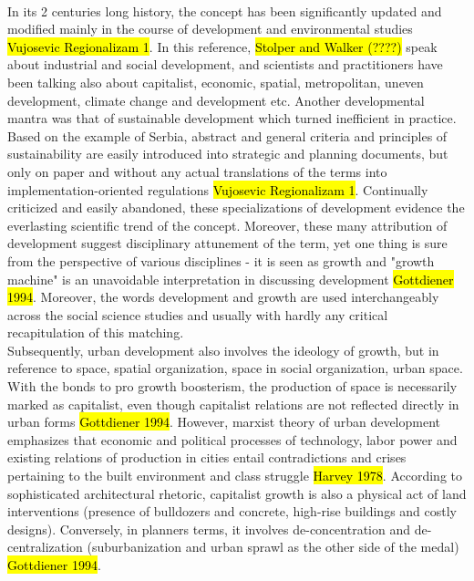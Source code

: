 \documentclass[11pt]{report}
\begin{document}
\\
In its 2 centuries long history, the concept has been significantly updated and modified mainly in the course of development and environmental studies \hl{Vujosevic Regionalizam 1}. In this reference, \hl{Stolper and Walker (????)} speak about industrial and social development, and scientists and practitioners have been talking also about capitalist, economic, spatial, metropolitan, uneven development, climate change and development etc.
Another developmental mantra was that of sustainable development which turned inefficient in practice\footnotemark. Based on the example of Serbia, abstract and general criteria and principles of sustainability are easily introduced into strategic and planning documents, but only on paper and without any actual translations of the terms into implementation-oriented regulations \hl{Vujosevic Regionalizam 1}.
Continually criticized and easily abandoned, these specializations of development evidence the everlasting scientific trend of the concept.
Moreover, these many attribution of development suggest disciplinary attunement of the term, yet one thing is sure from the perspective of various disciplines - it is seen as growth and "growth machine" is an unavoidable interpretation in discussing development \hl{Gottdiener 1994}.
Moreover, the words development and growth are used interchangeably across the social science studies and usually with hardly any critical recapitulation of this matching. 
\\
Subsequently, urban development also involves the ideology of growth, but in reference to space, spatial organization, space in social organization, urban space.
With the bonds to pro growth boosterism, the production of space is necessarily marked as capitalist, even though capitalist relations are not reflected directly in urban forms \hl{Gottdiener 1994}. 
However, marxist theory of urban development emphasizes that economic and political processes of technology, labor power and existing relations of production in cities entail contradictions and crises pertaining to the built environment and class struggle \hl{Harvey 1978}.
According to sophisticated architectural rhetoric, capitalist growth is also a physical act of land interventions (presence of bulldozers and concrete, high-rise buildings and costly designs). Conversely, in planners terms, it involves de-concentration and de-centralization (suburbanization and urban sprawl as the other side of the medal) \hl{Gottdiener 1994}.
\end{document}
